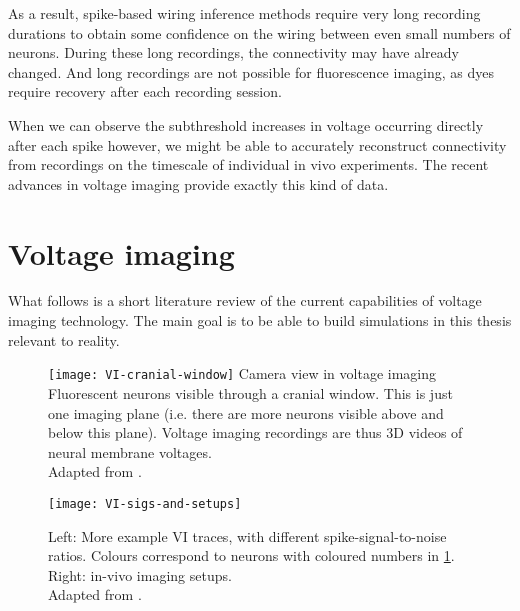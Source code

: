 As a result, spike-based wiring inference methods require very long recording durations to obtain some confidence on the wiring between even small numbers of neurons. During these long recordings, the connectivity may have already changed. And long recordings are not possible for fluorescence imaging, as dyes require recovery after each recording session.

When we can observe the subthreshold increases in voltage occurring directly after each spike however, we might be able to accurately reconstruct connectivity from recordings on the timescale of individual in vivo experiments. The recent advances in voltage imaging provide exactly this kind of data.



\clearpage
\section{Voltage imaging}
\label{sec:voltage-imaging}

What follows is a short literature review of the current capabilities of voltage imaging technology. The main goal is to be able to build simulations in this thesis relevant to reality.

\FloatBarrier

\begin{figure}
    \texttt{[image: VI-cranial-window]}
    \captionn
        {Camera view in voltage imaging}
        {Fluorescent neurons visible through a cranial window. This is just one imaging plane (i.e. there are more neurons visible above and below this plane). Voltage imaging recordings are thus 3D videos of neural membrane voltages.\\
        Adapted from \cite{Abdelfattah2019BrightPhotostableChemigenetic,Knopfel2019OpticalVoltageImaging}.}
    \label{fig:VI-cranial-window}
\end{figure}

\begin{figure}
    \texttt{[image: VI-sigs-and-setups]}
    \caption
        {Left: More example VI traces, with different spike-signal-to-noise ratios. Colours correspond to neurons with coloured numbers in \cref{fig:VI-cranial-window}. Right: in-vivo imaging setups.\\
        Adapted from \cite{Abdelfattah2019BrightPhotostableChemigenetic,Knopfel2019OpticalVoltageImaging}.}
    \label{fig:VI-sigs-and-setups}
\end{figure}



